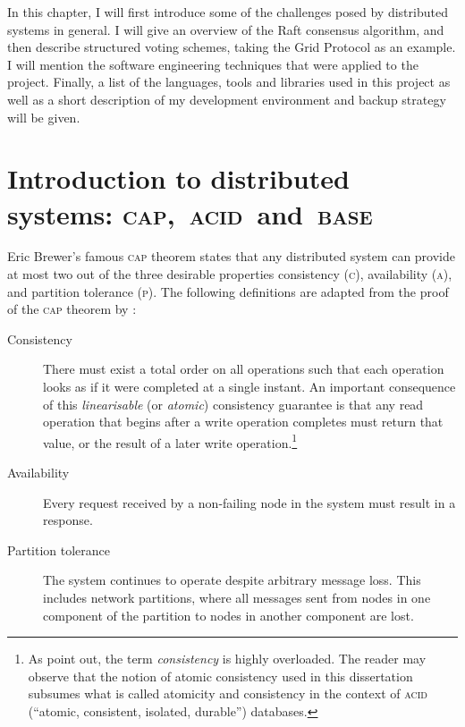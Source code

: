 \documentclass[12pt,chapterprefix=true,toc=bibliography,numbers=noendperiod,
               footnotes=multiple,twoside]{scrreprt}
\begin{document}
In this chapter, I will first introduce some of the challenges posed by distributed systems in general. I will give an overview of the Raft consensus algorithm, and then describe structured voting schemes, taking the Grid Protocol as an example. I will mention the software engineering techniques that were applied to the project. Finally, a list of the languages, tools and libraries used in this project as well as a short description of my development environment and backup strategy will be given.


\section[Introduction to distributed systems]{Introduction to distributed systems: \textsc{cap},~\textsc{acid}~and~\textsc{base}}
\label{ssc:cap-acid-and-base}

Eric Brewer's famous \textsc{cap} theorem states that any distributed system can provide at most two out of the three desirable properties consistency (\textsc{c}), availability (\textsc{a}), and partition tolerance (\textsc{p}).\autocite{cap} The following definitions are adapted from the proof of the \textsc{cap} theorem by \citeauthor{capproof}:\autocite{capproof}

\begin{description}
    \item[Consistency] There must exist a total order on all operations such that each operation looks as if it were completed at a single instant. An important consequence of this \emph{linearisable} (or \emph{atomic}) consistency guarantee is that any read operation that begins after a write operation completes must return that value, or the result of a later write operation.\footnote{As \textcite{capproof} point out, the term \emph{consistency} is highly overloaded. The reader may observe that the notion of atomic consistency used in this dissertation subsumes what is called atomicity and consistency in the context of \textsc{acid} (\enquote{atomic, consistent, isolated, durable}) databases.}
    \item[Availability] Every request received by a non-failing node in the system must result in a response.
    \item[Partition tolerance] The system continues to operate despite arbitrary message loss. This includes network partitions, where all messages sent from nodes in one component of the partition to nodes in another component are lost.
\end{description}
\end{document}
